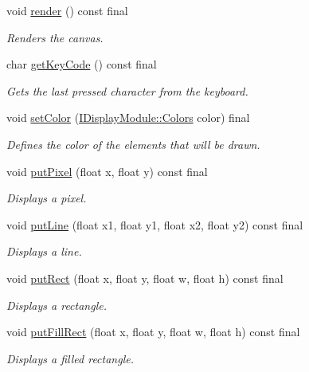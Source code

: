 \begin{DoxyCompactItemize}
void \mbox{\hyperlink{classArcade_1_1Display_1_1SDL_a81d987b70ba70d67f92b9c93e2fea833}{render}} () const final
\begin{DoxyCompactList}\small\item\em Renders the canvas. \end{DoxyCompactList}\item 
char \mbox{\hyperlink{classArcade_1_1Display_1_1SDL_a3ba94b49b72c9e189f52af7b97f4ad91}{get\+Key\+Code}} () const final
\begin{DoxyCompactList}\small\item\em Gets the last pressed character from the keyboard. \end{DoxyCompactList}\item 
void \mbox{\hyperlink{classArcade_1_1Display_1_1SDL_a857d2a5ab8266a1e11f528f398e3f55d}{set\+Color}} (\mbox{\hyperlink{classArcade_1_1Display_1_1IDisplayModule_ae0a776be9163d096051c522e21c007b2}{I\+Display\+Module\+::\+Colors}} color) final
\begin{DoxyCompactList}\small\item\em Defines the color of the elements that will be drawn. \end{DoxyCompactList}\item 
void \mbox{\hyperlink{classArcade_1_1Display_1_1SDL_a5c3f965b3394c9654f3537cab1201c1c}{put\+Pixel}} (float x, float y) const final
\begin{DoxyCompactList}\small\item\em Displays a pixel. \end{DoxyCompactList}\item 
void \mbox{\hyperlink{classArcade_1_1Display_1_1SDL_a4bfe74035db304e935265aae7d85f21a}{put\+Line}} (float x1, float y1, float x2, float y2) const final
\begin{DoxyCompactList}\small\item\em Displays a line. \end{DoxyCompactList}\item 
void \mbox{\hyperlink{classArcade_1_1Display_1_1SDL_a81a7dc1e2ec20a453ca12d24b079968e}{put\+Rect}} (float x, float y, float w, float h) const final
\begin{DoxyCompactList}\small\item\em Displays a rectangle. \end{DoxyCompactList}\item 
void \mbox{\hyperlink{classArcade_1_1Display_1_1SDL_a83252dfdf7260a64e6c1bad921c6a2fa}{put\+Fill\+Rect}} (float x, float y, float w, float h) const final
\begin{DoxyCompactList}\small\item\em Displays a filled rectangle. \end{DoxyCompactList}\item 

\end{DoxyCompactItemize}
